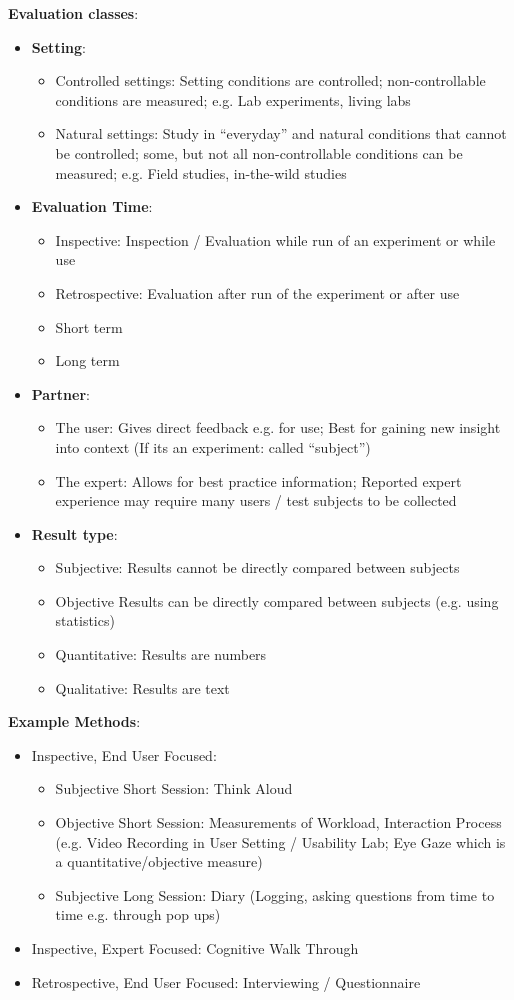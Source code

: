 \textbf{Evaluation classes}:
\begin{itemize}
\item \textbf{Setting}:
\begin{itemize}
\item Controlled settings: Setting conditions are controlled; non-controllable conditions are measured; e.g. Lab experiments, living labs
\item Natural settings: Study in ``everyday'' and natural conditions that cannot be controlled; some, but not all non-controllable conditions can be measured; e.g. Field studies, in-the-wild studies
\end{itemize}
\item \textbf{Evaluation Time}:
\begin{itemize}
\item Inspective: Inspection / Evaluation while run of an experiment or while use
\item Retrospective: Evaluation after run of the experiment or after use
\item Short term
\item Long term
\end{itemize}
\item \textbf{Partner}:
\begin{itemize}
\item The user: Gives direct feedback e.g. for use; Best for gaining new insight into context (If its an experiment: called ``subject'')
\item The expert: Allows for best practice information; Reported expert experience may require many users / test subjects to be collected
\end{itemize}
\item \textbf{Result type}:
\begin{itemize}
\item Subjective: Results cannot be directly compared between subjects
\item Objective Results can be directly compared between subjects (e.g. using statistics)
\item Quantitative: Results are numbers
\item Qualitative: Results are text
\end{itemize}
\end{itemize}
\textbf{Example Methods}:
\begin{itemize}
\item Inspective, End User Focused:
\begin{itemize}
\item Subjective Short Session: Think Aloud
\item Objective Short Session: Measurements of Workload, Interaction Process (e.g. Video Recording in User Setting / Usability Lab; Eye Gaze which is a quantitative/objective measure)
\item Subjective Long Session: Diary (Logging, asking questions from time to time e.g. through pop ups)
\end{itemize}
\item Inspective, Expert Focused: Cognitive Walk Through
\item Retrospective, End User Focused: Interviewing / Questionnaire
\end{itemize}
